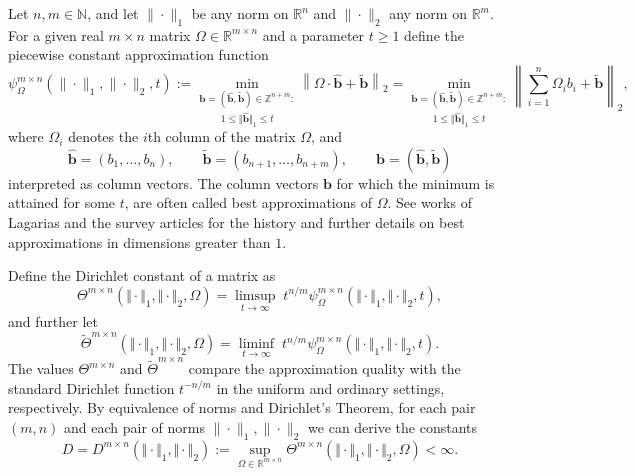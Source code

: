 \documentclass[10pt]{amsart}
\theoremstyle{definition}
\newcommand{\R}{\mathbb{R}}
\newcommand{\Z}{\mathbb{Z}}
\newcommand{\N}{\mathbb{N}}
\begin{document}
Let $n,m \in \N$, and let $\|\cdot\|_{1}$ be any norm on $\R^{n}$ and $\|\cdot\|_{2}$ any norm on $\R^{m}$. For a given real $m\times n$ matrix $\Omega \in \R^{m\times n}$ 
and a parameter $t\ge 1$ define the piecewise constant approximation function
\[
\psi_{\Omega}^{m\times n}(\|\cdot\|_{1},\|\cdot\|_{2}, t):=
\underset{ 1 \leq \Vert \boldsymbol{\hat{b}}\Vert_{1}\leq t }{\min_{\boldsymbol{b}=(\hat{\boldsymbol{b}},\tilde{\boldsymbol{b}})\in \Z^{n+m}:}}  \left\|\Omega \cdot \widehat{\boldsymbol{b}} + \tilde{\boldsymbol{b}} \right\|_{2}
=
\underset{ 1 \leq \Vert \boldsymbol{\hat{b}}\Vert_{1}\leq t }{\min_{\boldsymbol{b}=(\hat{\boldsymbol{b}},\tilde{\boldsymbol{b}})\in \Z^{n+m}:}}  \left\|\sum_{i=1}^{n}\Omega_{i}b_{i} + \tilde{\boldsymbol{b}} \right\|_{2},
\]
where $\Omega_{i}$ denotes the $i$th column of the matrix $\Omega$, and 
\begin{equation} \label{eq:hatnot}
    \hat{\boldsymbol{b}}=(b_{1},\dots,b_{n}), \qquad \tilde{\boldsymbol{b}}=(b_{n+1},\dots,b_{n+m}),\qquad \boldsymbol{b}=(\hat{\boldsymbol{b}},\tilde{\boldsymbol{b}}) 
\end{equation}
interpreted as column vectors. The column vectors $\boldsymbol{b}$ for which the minimum is attained for some $t$, are often called best approximations of $\Omega$. See works of Lagarias \cite{Lagarias1,Lagarias2} and the survey articles \cite{moshchevitinsurvey, Chevalliersurvey} for the history and further details on best approximations in dimensions greater than $1$.  \par
Define the Dirichlet constant of a matrix as
\[
\Theta^{m\times n}(\Vert\cdot\Vert_1,\Vert\cdot\Vert_2,\Omega)= \limsup_{t\to\infty}\; t^{n/m} \psi_{\Omega}^{m\times n}(\Vert\cdot\Vert_1,\Vert\cdot\Vert_2,t),
\]
and further let
\[
\widetilde{\Theta}^{m\times n}(\Vert\cdot\Vert_1,\Vert\cdot\Vert_2,\Omega)= \liminf_{t\to\infty}\; t^{n/m} \psi_{\Omega}^{m\times n}(\Vert\cdot\Vert_1,\Vert\cdot\Vert_2,t).
\]
The values $\Theta^{m\times n}$ and $\widetilde{\Theta}^{m\times n}$ 
compare the approximation quality with
the standard Dirichlet function $t^{-n/m}$ in the uniform and ordinary settings, respectively. By equivalence of norms and Dirichlet's Theorem, for each pair $(m,n)$ and each pair of norms $\|\cdot\|_{1},\|\cdot\|_{2}$ we can derive the constants
\begin{equation} \label{eq:obben}
D=D^{m\times n}(\Vert\cdot\Vert_1,\Vert\cdot\Vert_2):= \sup_{\Omega\in\R^{m\times n}} \Theta^{m\times n}(\Vert\cdot\Vert_1,\Vert\cdot\Vert_2,\Omega) < \infty.
\end{equation}
\end{document}
